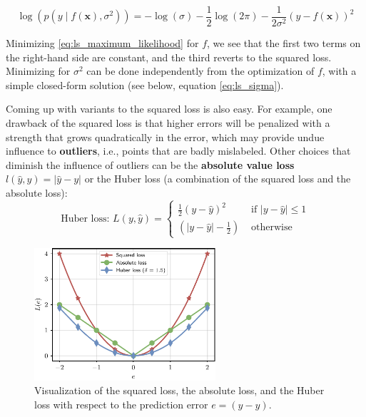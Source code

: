 \begin{equation}
\log(p(y \mid f(\mathbf{x}), \sigma^2)) = -\log(\sigma) - \frac{1}{2}\log(2\pi) - \frac{1}{2\sigma^2}(y - f(\mathbf{x}))^2
\label{eq:ls_maximum_likelihood}
\end{equation}

Minimizing \eqref{eq:ls_maximum_likelihood} for $f$, we see that the first two terms on the right-hand side are constant, and the third reverts to the squared loss. Minimizing for $\sigma^2$ can be done independently from the optimization of $f$, with a simple closed-form solution (see below, equation \eqref{eq:ls_sigma}).

Coming up with variants to the squared loss is also easy. For example, one drawback of the squared loss is that higher errors will be penalized with a strength that grows quadratically in the error, which may provide undue influence to \textbf{outliers}, i.e., points that are badly mislabeled. Other choices that diminish the influence of outliers can be the \textbf{absolute value loss} $l(\hat{y}, y) = \lvert \hat{y} - y \rvert$ or the Huber loss (a combination of the squared loss and the absolute loss):
%
\begin{equation}
\text{Huber loss: } L(y, \hat{y}) = \begin{cases} \frac{1}{2}\left(y - \hat{y}\right)^2 & \text{ if } \lvert y - \hat{y} \rvert \le 1 \\ \left(\lvert y - \hat{y} \rvert - \frac{1}{2}\right) & \text{ otherwise } \end{cases}
\end{equation}
%
\begin{figure}
    \centering
    \hspace{1em}\includegraphics[width=0.6\textwidth]{images/loss_functions_regression.pdf}
    \caption{Visualization of the squared loss, the absolute loss, and the Huber loss with respect to the prediction error $e = (\hat{y} - y)$.}
    \label{fig:losses_regression}
\end{figure}

